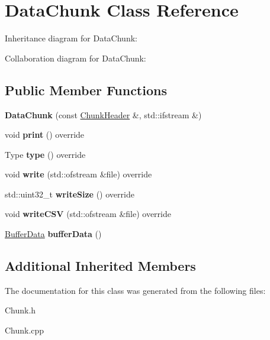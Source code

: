 \hypertarget{classDataChunk}{}\section{Data\+Chunk Class Reference}
\label{classDataChunk}


Inheritance diagram for Data\+Chunk\+:


Collaboration diagram for Data\+Chunk\+:
\subsection*{Public Member Functions}
\begin{DoxyCompactItemize}
\item 
\mbox{\label{classDataChunk_a0a1ec4b51dbd7e678fcc8f8a965314e5}} 
{\bfseries Data\+Chunk} (const \hyperlink{structChunkHeader}{Chunk\+Header} \&, std\+::ifstream \&)
\item 
\mbox{\label{classDataChunk_a4bb3122781ba26eddc254f419a8828ef}} 
void {\bfseries print} () override
\item 
\mbox{\label{classDataChunk_a1a6a37ab6c5ab94b8f102f040c7257b9}} 
Type {\bfseries type} () override
\item 
\mbox{\label{classDataChunk_aaabd84aa1abf046c9b55d5b0537a3da8}} 
void {\bfseries write} (std\+::ofstream \&file) override
\item 
\mbox{\label{classDataChunk_a0468fefd05849e03992a749b29cbd1ac}} 
std\+::uint32\+\_\+t {\bfseries write\+Size} () override
\item 
\mbox{\label{classDataChunk_a3f135dde7ac5e4c4290972cc0dd127ae}} 
void {\bfseries write\+C\+SV} (std\+::ofstream \&file) override
\item 
\mbox{\label{classDataChunk_aed5c5b8405136dea58e75ada7053e74f}} 
\hyperlink{structBufferData}{Buffer\+Data} {\bfseries buffer\+Data} ()
\end{DoxyCompactItemize}
\subsection*{Additional Inherited Members}


The documentation for this class was generated from the following files\+:\begin{DoxyCompactItemize}
\item 
Chunk.\+h\item 
Chunk.\+cpp\end{DoxyCompactItemize}
